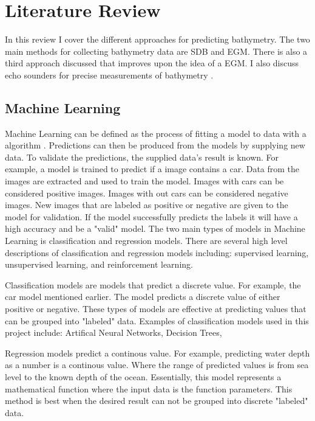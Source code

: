 \section{Literature Review}
\setlength{\parindent}{10ex}
In this review I cover the different approaches for predicting bathymetry.
The two main methods for collecting bathymetry data are \ac{SDB} and \ac{EGM}.
There is also a third approach discussed that improves upon the idea of a \ac{EGM}.
I also discuss echo sounders for precise measurements of bathymetry \cite{farr1980multibeam}.

\subsection{Machine Learning}
Machine Learning can be defined as the process of fitting a model to data with a algorithm \cite{bishop2006pattern}.
Predictions can then be produced from the models by supplying new data.
To validate the predictions, the supplied data's result is known.
For example, a model is trained to predict if a image contains a car.
Data from the images are extracted and used to train the model.
Images with cars can be considered positive images.
Images with out cars can be considered negative images.
New images that are labeled as positive or negative are given to the model for validation.
If the model successfully predicts the labels it will have a high accuracy and be a "valid" model.
The two main types of models in Machine Learning is classification and regression models.
There are several high level descriptions of classification and regression models including: supervised learning, unsupervised learning, and reinforcement learning.

\par
Classification models are models that predict a discrete value.
For example, the car model mentioned earlier.
The model predicts a discrete value of either positive or negative.
These types of models are effective at predicting values that can be grouped into "labeled" data.
Examples of classification models used in this project include: Artifical Neural Networks, Decision Trees, 

\par
Regression models predict a continous value.
For example, predicting water depth as a number is a continous value.
Where the range of predicted values is from sea level to the known depth of the ocean.
Essentially, this model represents a mathematical function where the input data is the function parameters.
This method is best when the desired result can not be grouped into discrete "labeled" data.

